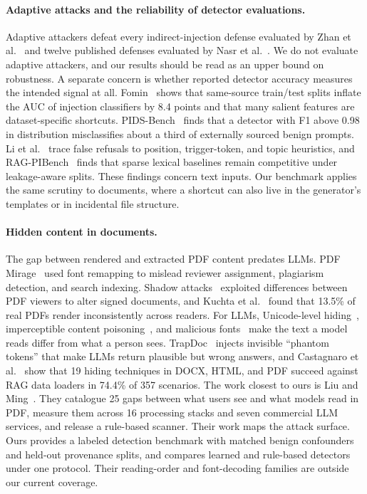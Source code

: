 \paragraph{Adaptive attacks and the reliability of detector evaluations.}
Adaptive attackers defeat every indirect-injection defense evaluated by Zhan
et al.~\cite{zhan2025adaptive} and twelve published defenses evaluated by
Nasr et al.~\cite{nasr2026attacker}. We do not evaluate adaptive attackers,
and our results should be read as an upper bound on robustness. A separate
concern is whether reported detector accuracy measures the intended signal
at all. Fomin~\cite{fomin2026when} shows that same-source train/test splits
inflate the AUC of injection classifiers by 8.4 points and that many
salient features are dataset-specific shortcuts. PIDS-Bench~\cite{shire2026pidsbench}
finds that a detector with F1 above 0.98 in distribution misclassifies about
a third of externally sourced benign prompts. Li et al.~\cite{li2026defenses}
trace false refusals to position, trigger-token, and topic heuristics, and
RAG-PIBench~\cite{jaffal2026ragpibench} finds that sparse lexical baselines
remain competitive under leakage-aware splits. These findings concern text
inputs. Our benchmark applies the same scrutiny to documents, where a
shortcut can also live in the generator's templates or in incidental file
structure.

\paragraph{Hidden content in documents.}
The gap between rendered and extracted PDF content predates LLMs. PDF
Mirage~\cite{markwood2017pdf} used font remapping to mislead reviewer
assignment, plagiarism detection, and search indexing. Shadow
attacks~\cite{mainka2021shadow} exploited differences between PDF viewers to
alter signed documents, and Kuchta et al.~\cite{kuchta2018correctness}
found that 13.5\% of real PDFs render inconsistently across readers. For
LLMs, Unicode-level hiding~\cite{boucher2022bad,boucher2023trojan,gao2025imperceptible},
imperceptible content poisoning~\cite{zhang2024imperceptible}, and malicious
fonts~\cite{xiong2025invisible,luo2026exploiting} make the text a model reads
differ from what a person sees. TrapDoc~\cite{jin2025trapdoc} injects
invisible ``phantom tokens'' that make LLMs return plausible but wrong
answers, and Castagnaro et al.~\cite{castagnaro2025hidden} show that 19
hiding techniques in DOCX, HTML, and PDF succeed against RAG data loaders in
74.4\% of 357 scenarios. The work closest to ours is Liu and
Ming~\cite{liu2027what}. They catalogue 25 gaps between what users see and
what models read in PDF, measure them across 16 processing stacks and seven
commercial LLM services, and release a rule-based scanner. Their work maps
the attack surface. Ours provides a labeled detection benchmark with matched
benign confounders and held-out provenance splits, and compares learned and
rule-based detectors under one protocol. Their reading-order and
font-decoding families are outside our current coverage.

